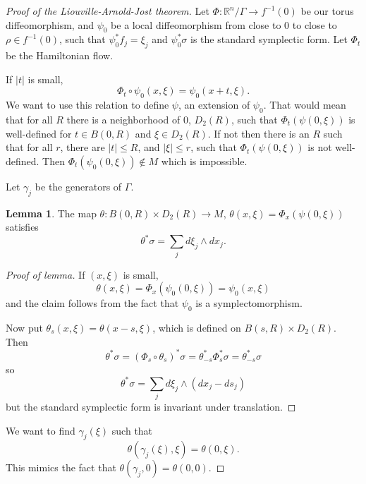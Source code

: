 \documentclass[12pt]{report}
\newcommand{\RR}{\mathbb{R}}
\theoremstyle{definition}
\newtheorem{lemma}[theorem]{Lemma}
\begin{document}
\begin{proof}[Proof of the Liouville-Arnold-Jost theorem]
Let $\Phi: \RR^n/\Gamma \to f^{-1}(0)$ be our torus diffeomorphism, and $\psi_0$ be a local diffeomorphism from close to $0$ to close to $\rho \in f^{-1}(0)$, such that $\psi_0^*f_j = \xi_j$ and $\psi_0^*\sigma$ is the standard symplectic form.
Let $\Phi_t$ be the Hamiltonian flow.

If $|t|$ is small,
$$\Phi_t \circ \psi_0(x, \xi) = \psi_0(x + t, \xi).$$
We want to use this relation to define $\psi$, an extension of $\psi_0$. That would mean that for all $R$ there is a neighborhood of $0$, $D_2(R)$, such that $\Phi_t(\psi(0, \xi))$ is well-defined for $t \in B(0, R)$ and $\xi \in D_2(R)$. If not then there is an $R$ such that for all $r$, there are $|t| \leq R$, and $|\xi| \leq r$, such that $\Phi_t(\psi(0, \xi))$ is not well-defined.
Then $\Phi_t(\psi_0(0, \xi)) \notin M$ which is impossible.

Let $\gamma_j$ be the generators of $\Gamma$.

\begin{lemma}
The map $\theta: B(0, R) \times D_2(R) \to M$, $\theta(x, \xi) = \Phi_x(\psi(0, \xi))$ satisfies
$$\theta^*\sigma = \sum_j d\xi_j \wedge dx_j.$$
\end{lemma}
\begin{proof}[Proof of lemma]
If $(x, \xi)$ is small,
$$\theta(x, \xi) = \Phi_x(\psi_0(0, \xi)) = \psi_0(x, \xi)$$
and the claim follows from the fact that $\psi_0$ is a symplectomorphism.

Now put $\theta_s(x, \xi) = \theta(x - s, \xi)$, which is defined on $B(s, R) \times D_2(R)$. Then
$$\theta^*\sigma = (\Phi_s \circ \theta_s)^*\sigma = \theta_{-s}^*\Phi_s^*\sigma = \theta_{-s}^*\sigma$$
so
$$\theta^*\sigma = \sum_j d\xi_j \wedge (dx_j - ds_j)$$
but the standard symplectic form is invariant under translation.
\end{proof}

We want to find $\gamma_j(\xi)$ such that
$$\theta(\gamma_j(\xi), \xi) = \theta(0, \xi).$$
This mimics the fact that $\theta(\gamma_j, 0) = \theta(0, 0)$.


\end{proof}
\end{document}
